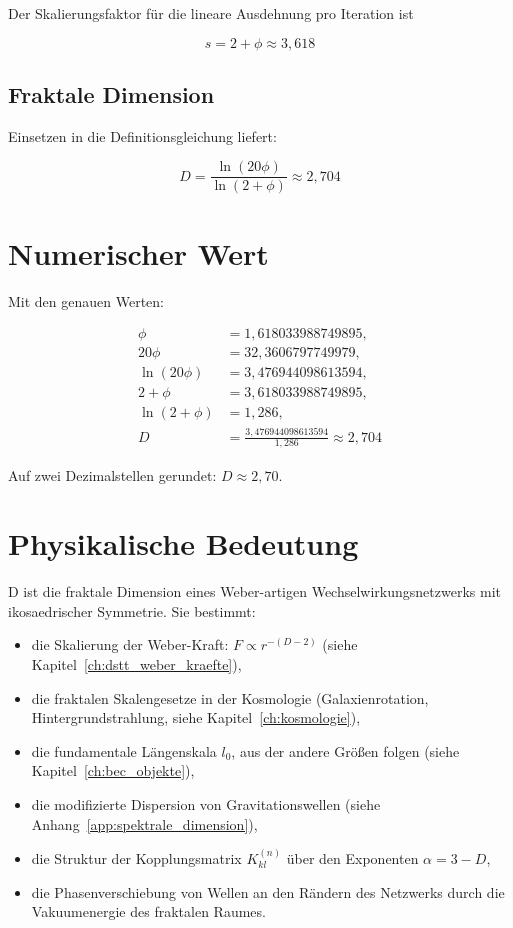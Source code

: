 Der Skalierungsfaktor für die lineare Ausdehnung pro Iteration ist

\[
s = 2 + \phi \approx 3,618
\]

\subsection{Fraktale Dimension}
\label{sub:d_formel}

Einsetzen in die Definitionsgleichung liefert:

\[
D = \frac{\ln(20\phi)}{\ln(2 + \phi)} \approx 2,704
\]

\section{Numerischer Wert}
\label{sec:d_numerisch}

Mit den genauen Werten:

\begin{align*}
\phi &= 1,618033988749895, \\
20\phi &= 32,3606797749979, \\
\ln(20\phi) &= 3,476944098613594, \\
2 + \phi &= 3,618033988749895, \\
\ln(2 + \phi) &= 1,286, \\
D &= \frac{3,476944098613594}{1,286} \approx 2,704
\end{align*}

Auf zwei Dezimalstellen gerundet: \( D \approx 2,70 \).

\section{Physikalische Bedeutung}
\label{sec:d_bedeutung}

D ist die fraktale Dimension eines Weber-artigen Wechselwirkungsnetzwerks mit ikosaedrischer Symmetrie. Sie bestimmt:

\begin{itemize}
    \item die Skalierung der Weber-Kraft: \( F \propto r^{-(D-2)} \) (siehe Kapitel~\ref{ch:dstt_weber_kraefte}),
    \item die fraktalen Skalengesetze in der Kosmologie (Galaxienrotation, Hintergrundstrahlung, siehe Kapitel~\ref{ch:kosmologie}),
    \item die fundamentale Längenskala \( l_0 \), aus der andere Größen folgen (siehe Kapitel~\ref{ch:bec_objekte}),
    \item die modifizierte Dispersion von Gravitationswellen (siehe Anhang~\ref{app:spektrale_dimension}),
    \item die Struktur der Kopplungsmatrix \( K_{kl}^{(n)} \) über den Exponenten \( \alpha = 3 - D \),
    \item die Phasenverschiebung von Wellen an den Rändern des Netzwerks durch die Vakuumenergie des fraktalen Raumes.
\end{itemize}

